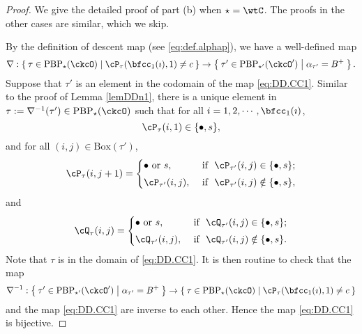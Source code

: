 \documentclass[12pt,a4paper]{amsart}
\def\DD{\nabla}
\numberwithin{equation}{section}
\theoremstyle{remark}
\def\ckcOp{\ckcO^{\prime}}
\def\BOX{\mathrm{Box}}
\def\PBP{\mathrm{PBP}}
\begin{document}
\begin{proof}
  We give the detailed proof of part (b) when $\star=\wtC$.
  The proofs in the other  cases are similar, which we skip.

By the definition of descent map (see \eqref{eq:def.alphap}), we have a well-defined map
\begin{equation}\label{eq:DD.CC1}
\DD: \Set{\tau\in \PBP_{\star}(\ckcO)| \cP_\tau(\bfcc_{1}(\imath),1)\neq c}\rightarrow \Set{\tau'\in \PBP_{\star'}(\ckcOp)|  \alpha_{\tau'}=B^+}.
\end{equation}
Suppose that $\tau'$ is an element  in the codomain of the map \eqref{eq:DD.CC1}. Similar to the proof of Lemma \ref{lemDDn1}, there is a unique element in $\tau:=\nabla^{-1}(\tau')\in \PBP_{\star}(\ckcO)$ such that
for all $i=1,2, \cdots,\bfcc_{1}(\imath)$,
\[
  \cP_{\tau}(i,1)\in \{\bullet, s\},
\]
and
for all $(i,j)\in \BOX(\tau')$,
\[
     \cP_\tau(i,j+1)=\begin{cases}
    \bullet \textrm{ or } s,&\textrm{ if  $\ \cP_{\tau'}(i,j)\in \{\bullet, s\}$;} \smallskip \\
  \cP_{\tau'}(i,j),& \textrm{ if $\ \cP_{\tau'}(i,j)\notin \{\bullet, s\}$},\end{cases}
\]
 and
 \[
     \cQ_\tau(i,j)=\begin{cases}
    \bullet \textrm{ or } s,&\textrm{ if  $\ \cQ_{\tau'}(i,j)\in \{\bullet, s\}$;} \smallskip \\
  \cQ_{\tau'}(i,j), & \textrm{ if $\ \cQ_{\tau'}(i,j)\notin \{\bullet, s\}$}.  \end{cases}
\]
Note that $\tau$ is in the domain of \eqref{eq:DD.CC1}. It is then routine to check that the map
\[
  \nabla^{-1}: \Set{\tau'\in \PBP_{\star'}(\ckcOp)|  \alpha_{\tau'}=B^+}
  \rightarrow  \Set{\tau\in \PBP_{\star}(\ckcO)| \cP_\tau(\bfcc_{1}(\imath),1)\neq c}
\]
and the map \eqref{eq:DD.CC1} are inverse to each other. Hence the map \eqref{eq:DD.CC1} is bijective.

\smallskip


\end{proof}
\end{document}
